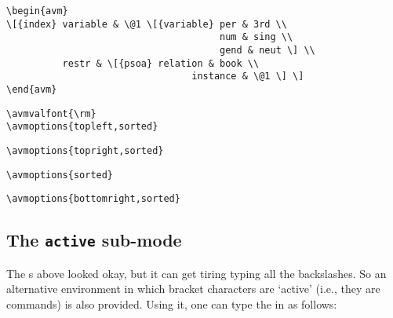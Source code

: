 \begin{example}
{\obeyspaces\begin{verbatim}
\begin{avm}
\[{index} variable & \@1 \[{variable} per & 3rd \\
                                      num & sing \\
                                      gend & neut \] \\
          restr & \[{psoa} relation & book \\
                                 instance & \@1 \] \]
\end{avm}
\end{verbatim}}
\end{example}

\begin{examples}
\item \verb+\avmvalfont{\rm}+\\
	\verb+\avmoptions{topleft,sorted}+

\item \verb+\avmoptions{topright,sorted}+
\item \verb+\avmoptions{sorted}+
\item \verb+\avmoptions{bottomright,sorted}+
\end{examples}




\subsection{The {\tt active} sub-mode}

The {\AVM}s above looked okay, but it can get tiring typing all the
backslashes.  So an alternative environment in which bracket characters are
`active' (i.e., they are commands) is also provided.  Using it, one can
type the {\AVM} in  as follows: 

